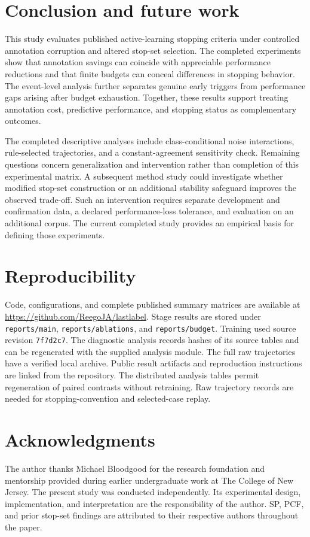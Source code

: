 \documentclass[10pt,twocolumn]{article}
\begin{document}
\section{Conclusion and future work}
This study evaluates published active-learning stopping criteria under controlled annotation corruption and altered stop-set selection. The completed experiments show that annotation savings can coincide with appreciable performance reductions and that finite budgets can conceal differences in stopping behavior. The event-level analysis further separates genuine early triggers from performance gaps arising after budget exhaustion. Together, these results support treating annotation cost, predictive performance, and stopping status as complementary outcomes.

The completed descriptive analyses include class-conditional noise interactions, rule-selected trajectories, and a constant-agreement sensitivity check. Remaining questions concern generalization and intervention rather than completion of this experimental matrix. A subsequent method study could investigate whether modified stop-set construction or an additional stability safeguard improves the observed trade-off. Such an intervention requires separate development and confirmation data, a declared performance-loss tolerance, and evaluation on an additional corpus. The current completed study provides an empirical basis for defining those experiments.

\section*{Reproducibility}
Code, configurations, and complete published summary matrices are available at \url{https://github.com/ReegoJA/lastlabel}. Stage results are stored under \texttt{reports/main}, \texttt{reports/ablations}, and \texttt{reports/budget}. Training used source revision \texttt{7f7d2c7}. The diagnostic analysis records hashes of its source tables and can be regenerated with the supplied analysis module. The full raw trajectories have a verified local archive. Public result artifacts and reproduction instructions are linked from the repository. The distributed analysis tables permit regeneration of paired contrasts without retraining. Raw trajectory records are needed for stopping-convention and selected-case replay.

\section*{Acknowledgments}
The author thanks Michael Bloodgood for the research foundation and mentorship provided during earlier undergraduate work at The College of New Jersey. The present study was conducted independently. Its experimental design, implementation, and interpretation are the responsibility of the author. SP, PCF, and prior stop-set findings are attributed to their respective authors throughout the paper.
\end{document}
